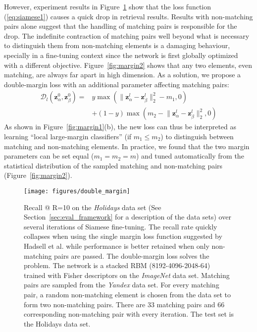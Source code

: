 \documentclass[10pt,twocolumn,letterpaper]{article}
\begin{document}
However, experiment results in Figure~\ref{fig:margin3} show that the loss function (\ref{eq:siamese1}) causes a quick drop in retrieval results.
Results with non-matching pairs alone suggest that the handling of matching pairs is responsible for the drop.
The indefinite contraction of matching pairs well beyond what is necessary to distinguish them from non-matching elements is a damaging behaviour, specially in a fine-tuning context since the network is first globally optimized with a different objective.
Figure~\ref{fig:margin2} shows that any two elements, even matching, are always far apart in high dimension.
As a solution, we propose a double-margin loss with an additional parameter affecting matching pairs:
\begin{equation}
\label{eq:siamese2}
\begin{split}
\mathcal{D}_l(\mathbf{z}_\alpha^0,\mathbf{z}_\beta^0) = &y \max(\lVert \mathbf{z}_\alpha^l - \mathbf{z}_\beta^l \rVert_2^2 - m_1, 0) \\
&+ (1-y) \max(m_2 - \lVert \mathbf{z}_\alpha^l - \mathbf{z}_\beta^l \rVert_2^2, 0)
\end{split}
\end{equation}
As shown in Figure~\ref{fig:margin1}(b), the new loss can thus be interpreted as learning ``local large-margin classifiers'' (if $m_1 \le m_2$) to distinguish between matching and non-matching elements.
In practice, we found that the two margin parameters can be set equal ($m_1 = m_2 = m$) and tuned automatically from the statistical distribution of the sampled matching and non-matching pairs (Figure~\ref{fig:margin2}).

\begin{figure}
	\centering
		\texttt{[image: figures/double\_margin]}
		\caption{\footnotesize Recall @ R=10 on the {\it Holidays} data set (See Section~\ref{sec:eval_framework} for a description of the data sets) over several iterations of Siamese fine-tuning.
The recall rate quickly collapses when using the single margin loss function suggested by Hadsell et al. \cite{Siamese} while performance is better retained when only non-matching pairs are passed.
The double-margin loss solves the problem.
The network is a stacked RBM (8192-4096-2048-64) trained with Fisher descriptors on the {\it ImageNet} data set. Matching pairs are sampled from the {\it Yandex} data set. 
For every matching pair, a random non-matching element is chosen from the data set to form two non-matching pairs.
There are 33 matching pairs and 66 corresponding non-matching pair with every iteration.
The test set is the Holidays data set. 
}
	
	\label{fig:margin3}
\end{figure}
\end{document}
